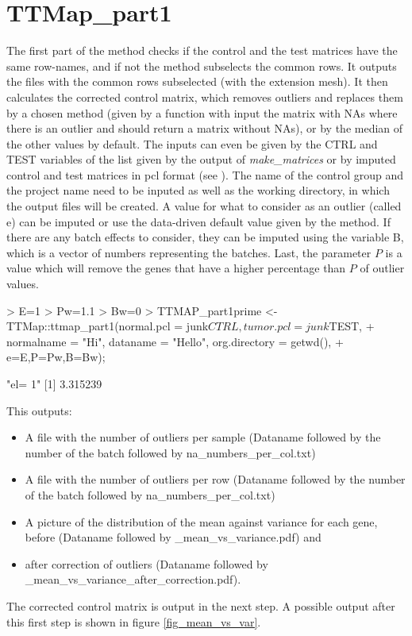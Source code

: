 \documentclass[a4paper,12pt]{article}
\begin{document}
\section{TTMap\_part1}
The first part of the method checks if the control and the test matrices have the same row-names, and if not the method subselects the common rows. It outputs the files with the common rows subselected (with the extension mesh).  It then calculates the corrected control matrix, which removes outliers and replaces them by a chosen method (given by a function with input the matrix with NAs where there is an outlier and should return a matrix without NAs), or by the median of the other values by default. The inputs can even be given by the CTRL and TEST variables of the list given by the output of \emph{make\_matrices} or by imputed control and test matrices in pcl format (see \cite{Monica}). The name of the control group and the project name need to be inputed as well as the working directory, in which the output files will be created. A value for what to consider as an outlier (called e) can be imputed or use the data-driven default value given by the method. If there are any batch effects to consider, they can be imputed using the variable B, which is a vector of numbers representing the batches. Last, the parameter $P$ is a value which will remove the genes that have a higher percentage than $P$ of outlier values. 

%
\begin{scriptsize}
\begin{Schunk}
\begin{Sinput}
> E=1
> Pw=1.1
> Bw=0
> TTMAP_part1prime <-TTMap::ttmap_part1(normal.pcl = junk$CTRL,tumor.pcl = junk$TEST, 
+ normalname = "Hi", dataname = "Hello", org.directory = getwd(),
+ e=E,P=Pw,B=Bw);
\end{Sinput}
\begin{Soutput}
[1] "el= 1"
[1] 3.315239
\end{Soutput}
\end{Schunk}
\end{scriptsize}

This outputs: 

\begin{itemize}
\item A file with the number of outliers per sample (Dataname followed by the number of the batch followed by na\_numbers\_per\_col.txt)
\item A file with the number of outliers per row (Dataname followed by the number of the batch followed by na\_numbers\_per\_col.txt)
\item A picture of the distribution of the mean against variance for each gene, before (Dataname followed by \_mean\_vs\_variance.pdf) and
\item after correction of outliers (Dataname followed by \\
\_mean\_vs\_variance\_after\_correction.pdf).
\end{itemize}
The corrected control matrix is output in the next step.
A possible output after this first step is shown in figure \ref{fig_mean_vs_var}.
                                                                                                                                           
\end{document}
